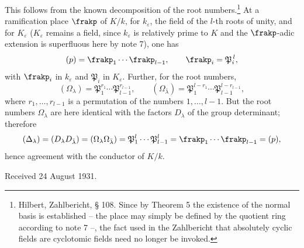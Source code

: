 This follows from the known decomposition of the root numbers.\footnote{Hilbert, Zahlbericht, § 108. Since by Theorem 5 the existence of the normal basis is established -- the place may simply be defined by the quotient ring according to note 7 --, the fact used in the Zahlbericht that absolutely cyclic fields are cyclotomic fields need no longer be invoked.} At a ramification place \(\frakp\) of \(K/k\), for \(k_\varepsilon\), the field of the \(l\)-th roots of unity, and for \(K_\varepsilon\) (\(K_\varepsilon\) remains a field, since \(k_\varepsilon\) is relatively prime to \(K\) and the \(\frakp\)-adic extension is superfluous here by note 7), one has
\[
        (p)=\frakp_1\cdots\frakp_{l-1},
        \qquad
        \frakp_i=\mathfrak P_i^{\,l},
\]
with \(\frakp_i\) in \(k_\varepsilon\) and \(\mathfrak P_i\) in \(K_\varepsilon\). Further, for the root numbers,
\[
        (\Omega_\lambda)=\mathfrak P_1^{r_1}\cdots\mathfrak P_{l-1}^{r_{l-1}},
        \qquad
        (\Omega_{\bar\lambda})=
        \mathfrak P_1^{l-r_1}\cdots\mathfrak P_{l-1}^{l-r_{l-1}},
\]
where \(r_1,
\ldots,r_{l-1}\) is a permutation of the numbers \(1,
\ldots,l-1\). But the root numbers \(\Omega_\lambda\) are here identical with the factors \(D_\lambda\) of the group determinant; therefore
\[
        (\Delta_\lambda)=(D_\lambda D_{\bar\lambda})
        =(\Omega_\lambda\Omega_{\bar\lambda})
        =\mathfrak P_1^{l}\cdots\mathfrak P_{l-1}^{l}
        =\frakp_1\cdots\frakp_{l-1}=(p),
\]
hence agreement with the conductor of \(K/k\).

\begin{center}
Received 24 August 1931.
\end{center}


\clearpage
